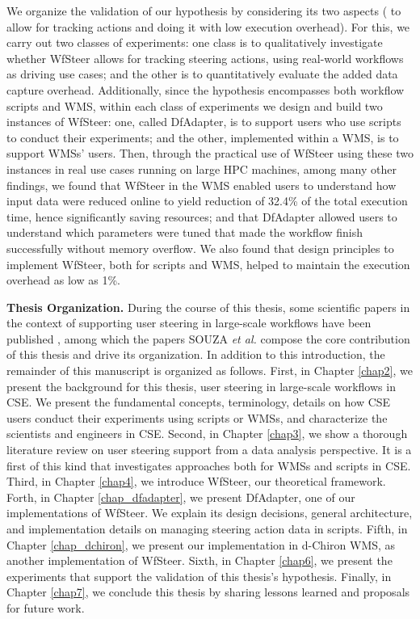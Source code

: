 We organize the validation of our hypothesis by considering its two aspects (\ie{} to allow for tracking actions and doing it with low execution overhead).
For this, we carry out two classes of experiments: one class is to qualitatively investigate whether WfSteer allows for tracking steering actions, using real-world workflows as driving use cases; and the other is to quantitatively evaluate the added data capture overhead.
Additionally, since the hypothesis encompasses both workflow scripts and WMS, within each class of experiments we design and build two instances of WfSteer: one, called DfAdapter,
is to support users who use scripts to conduct their experiments;
and the other, implemented within a WMS, is to support WMSs' users.
Then, through the practical use of WfSteer using these two instances in real use cases running on large HPC machines,
among many other findings,
we found that WfSteer in the WMS enabled users to understand how input data were reduced online to yield reduction of 32.4\% of the total execution time, hence significantly saving resources; and that DfAdapter allowed users to understand which parameters were tuned that made the workflow finish successfully without memory overflow.
We also found that design principles to implement WfSteer, both for scripts and WMS, helped to maintain the execution overhead as low as 1\%.


\noindent \textbf{Thesis Organization.}
During the course of this thesis, some scientific papers in the context of supporting user steering in large-scale workflows have been published \cite{
souza_keeping_2019,
Souza2017Data,
silva_adding_2018,
Souza2018Provenance,
souza_efficient_2019,
Souza2016Online,
Souza2017Tracking,
souza_towards_2018,
Souza2017Spark,
Souza2015Parallel,
Silva2018Capturing,
Silva2016Integrating}, among which the papers SOUZA \textit{et al.} \cite{Souza2017Data,Souza2018Provenance,souza_keeping_2019} compose the core contribution of this thesis and drive its organization.
In addition to this introduction, the remainder of this manuscript is organized as follows.
First, in Chapter \ref{chap2}, we present the background for this thesis,
\ie{} user steering in large-scale workflows in CSE. We present the fundamental concepts,
terminology, details on how CSE users conduct their experiments using scripts or WMSs,
and characterize the scientists and engineers in CSE.
Second, in Chapter \ref{chap3}, we show a thorough literature review on
user steering support from a data analysis perspective.
It is a first of this kind that investigates approaches both for WMSs and scripts in CSE.
Third, in Chapter \ref{chap4}, we introduce WfSteer, our theoretical framework.
Forth, in Chapter \ref{chap_dfadapter}, we present DfAdapter, one of our implementations of WfSteer. We explain its design decisions, general architecture, and implementation details on managing steering action data in scripts.
Fifth, in Chapter \ref{chap_dchiron}, we present our implementation in d-Chiron WMS, as another implementation of WfSteer.
Sixth, in Chapter \ref{chap6}, we present the experiments that support the validation of this thesis's hypothesis.
Finally, in Chapter \ref{chap7}, we conclude this thesis by sharing lessons learned and proposals for future work.


  